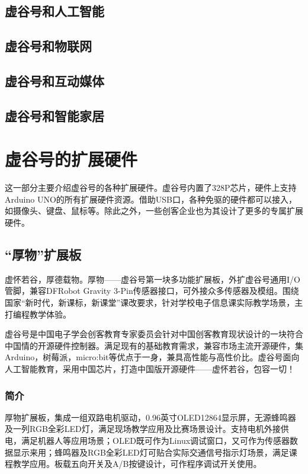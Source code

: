 \documentclass[letterpaper,10pt,english]{sphinxmanual}
\begin{document}
\section{虚谷号和人工智能}
\label{\detokenize{06.edu/6.1:id1}}\label{\detokenize{06.edu/6.1::doc}}

\section{虚谷号和物联网}
\label{\detokenize{06.edu/6.2:id1}}\label{\detokenize{06.edu/6.2::doc}}

\section{虚谷号和互动媒体}
\label{\detokenize{06.edu/6.3:id1}}\label{\detokenize{06.edu/6.3::doc}}

\section{虚谷号和智能家居}
\label{\detokenize{06.edu/6.4:id1}}\label{\detokenize{06.edu/6.4::doc}}

\chapter{虚谷号的扩展硬件}
\label{\detokenize{07.plus/index:id1}}\label{\detokenize{07.plus/index::doc}}
这一部分主要介绍虚谷号的各种扩展硬件。虚谷号内置了328P芯片，硬件上支持Arduino UNO的所有扩展硬件资源。借助USB口，各种免驱的硬件都可以接入，如摄像头、键盘、鼠标等。除此之外，一些创客企业也为其设计了更多的专属扩展硬件。


\section{“厚物”扩展板}
\label{\detokenize{07.plus/7.1-houwu:id1}}\label{\detokenize{07.plus/7.1-houwu::doc}}
虚怀若谷，厚德载物。厚物——虚谷号第一块多功能扩展板，外扩虚谷号通用I/O管脚，兼容DFRobot Gravity 3-Pin传感器接口，可外接众多传感器及模组。围绕国家“新时代，新课标，新课堂”课改要求，针对学校电子信息课实际教学场景，主打编程教学体验。

虚谷号是中国电子学会创客教育专家委员会针对中国创客教育现状设计的一块符合中国情的开源硬件控制器。满足现有的基础教育需求，兼容市场主流开源硬件，集Arduino，树莓派，micro:bit等优点于一身，兼具高性能与高性价比。虚谷号面向人工智能教育，采用中国芯片，打造中国版开源硬件——虚怀若谷，包容一切！


\subsection{简介}
\label{\detokenize{07.plus/7.1-houwu:id2}}
厚物扩展板，集成一组双路电机驱动，0.96英寸OLED12864显示屏，无源蜂鸣器及一列RGB全彩LED灯，满足现场教学应用及比赛场景设计。支持电机外接供电，满足机器人等应用场景；OLED既可作为Linux调试窗口，又可作为传感器数据显示来用；蜂鸣器及RGB全彩LED灯可贴合实际交通信号指示灯场景，满足课程教学应用。板载五向开关及A/B按键设计，可作程序调试开关使用。
\end{document}
